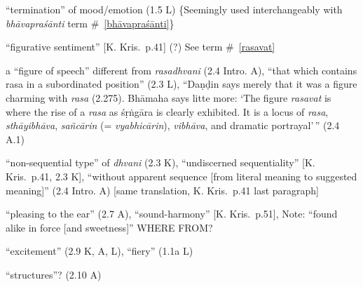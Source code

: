 \documentclass[10pt]{article}
\begin{document}
\begin{multicols}{2}
\begin{enumerate}[
			leftmargin=0em,
			rightmargin=0em,
		]
		 ``termination'' of mood/emotion (1.5 L) \{Seemingly used interchangeably with \textit{bhāvapraśānti} term \#~\ref{bhāvapraśānti}\}



		 ``figurative sentiment'' [K. Kris.\ p.41] (?)
		See term \#~\ref{rasavat}

		 a ``figure of speech'' different from \textit{rasadhvani} (2.4 Intro. A),
		``that which contains rasa in a subordinated position'' (2.3 L),
		``Daṇḍin says merely that it was a figure charming with \textit{rasa} (2.275).
		Bhāmaha says litte more: `The figure \textit{rasavat} is where the rise of a \textit{rasa} as śṛṅgāra is clearly exhibited. It is a locus of \textit{rasa}, \textit{sthāyibhāva}, \textit{sañcārin} (= \textit{vyabhicārin}), \textit{vibhāva}, and dramatic portrayal'\,'' (2.4 A.1)%

		\litem{---------} ``non-sequential type'' of \textit{dhvani} (2.3 K),
		``undiscerned sequentiality'' [K. Kris.\ p.41, 2.3 K],
		``without apparent sequence [from literal meaning to suggested meaning]'' (2.4 Intro. A)
		[same translation, K. Kris.\ p.41 last paragraph]%



		 ``pleasing to the ear'' (2.7 A), ``sound-harmony'' [K. Kris.\ p.51], Note: ``found alike in force [and sweetness]'' WHERE FROM?

		 ``excitement'' (2.9 K, A, L), ``fiery'' (1.1a L)

		 ``structures''? (2.10 A)




\end{enumerate}
\end{multicols}
\end{document}

